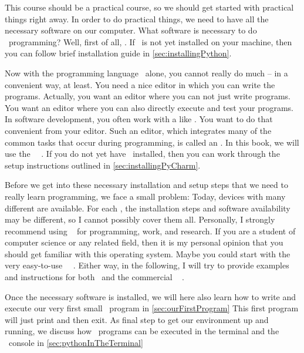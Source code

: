 %
%
This course should be a practical course, so we should get started with practical things right away.
In order to do practical things, we need to have all the necessary software on our computer.
What software is necessary to do \python\ programming?
Well, first of all, \python.
If \python\ is not yet installed on your machine, then you can follow brief installation guide in \cref{sec:installingPython}.

Now with the programming language \python\ alone, you cannot really do much -- in a convenient way, at least.
You need a nice editor in which you can write the programs.
Actually, you want an editor where you can not just write programs.
You want an editor where you can also directly execute and test your programs.
In software development, you often work with a  like \git.
You want to do that convenient from your editor.
Such an editor, which integrates many of the common tasks that occur during programming, is called an .
In this book, we will use the \pycharm\ ~\cite{VHN2023HOADWP,Y2022PPADT}.
If you do not yet have \pycharm\ installed, then you can work through the setup instructions outlined in \cref{sec:installingPyCharm}.

Before we get into these necessary installation and setup steps that we need to really learn programming, we face a small problem:
Today, devices with many different  are available.
For each , the installation steps and software availability may be different, so I cannot possibly cover them all.
Personally, I strongly recommend using \linux~\cite{T1999TLE,B2022ELATCL,H2022LML} for programming, work, and research.
If you are a student of computer science or any related field, then it is my personal opinion that you should get familiar with this operating system.
Maybe you could start with the very easy-to-use \ubuntu\ \linux~\cite{CN2020ULB,H2020ULU2E}.
Either way, in the following, I will try to provide examples and instructions for both \ubuntu\ and the commercial \microsoftWindows~\cite{B2023W1IO} .

Once the necessary software is installed, we will here also learn how to write and execute our very first small \python\ program in \cref{sec:ourFirstProgram}%
This first program will just print  and then exit.
As final step to get our environment up and running, we discuss how \python\ programs can be executed in the terminal and the \python\ console in \cref{sec:pythonInTheTerminal}%
%
%
%
%
%
%
%
%
\endhsection%
%
